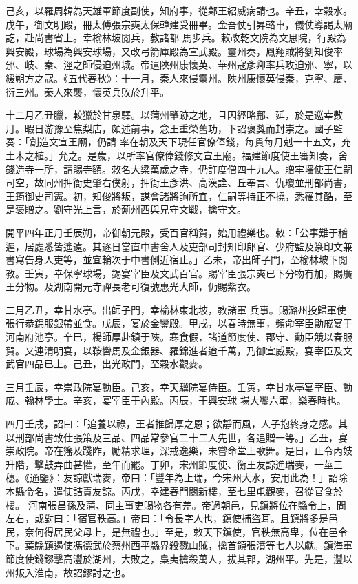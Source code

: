 \begin{pinyinscope}
 己亥，以羅周韓為天雄軍節度副使，知府事，從鄴王紹威病請也。辛丑，幸穀水。戊午，御文明殿，冊太傅張宗奭太保韓建受冊畢。金吾仗引昇輅車，儀仗導謁太廟訖，赴尚書省上。幸榆林坡閱兵，教諸都
 馬步兵。敕改乾文院為文思院，行殿為興安殿，球場為興安球場，又改弓箭庫殿為宣武殿。靈州奏，鳳翔賊將劉知俊率邠、岐、秦、涇之師侵迫州城。帝遣陜州康懷英、華州寇彥卿率兵攻迫邠、寧，以緩朔方之寇。《五代春秋》：十一月，秦人來侵靈州。陜州康懷英侵秦，克寧、慶、衍三州。秦人來襲，懷英兵敗於升平。



 十二月乙丑臘，較獵於甘泉驛。以蒲州肇跡之地，且因經略鄜、延，於是巡幸數月。暇日游豫至焦梨店，頗述前事，念王重榮舊功，下詔褒獎而封崇之。國子監奏：「創造文宣王廟，仍請
 率在朝及天下現任官僚俸錢，每貫每月剋一十五文，充土木之植。」允之。是歲，以所率官僚俸錢修文宣王廟。福建節度使王審知奏，舍錢造寺一所，請賜寺額。敕名大梁萬歲之寺，仍許度僧四十九人。贈牢墻使王仁嗣司空，故同州押衙史肇右僕射，押衙王彥洪、高漢詮、丘奉言、仇瓊並刑部尚書，王筠御史司憲。初，知俊將叛，謀會諸將詢所宜，仁嗣等持正不撓，悉罹其酷，至是褒贈之。劉守光上言，於薊州西與兄守文戰，擒守文。



 開平四年正月壬辰朔，帝御朝元殿，受百官稱賀，始用禮樂也。敕：「公事難于稽遲，居處悉皆遙遠。其逐日當直中書舍人及吏部司封知印郎官、少府監及篆印文兼書寫告身人吏等，並宜輪次于中書側近宿止。」乙未，帝出師子門，至榆林坡下閱教。壬寅，幸保寧球場，錫宴宰臣及文武百官。賜宰臣張宗奭已下分物有加，賜廣王分物。及湖南開元寺禪長老可復號惠光大師，仍賜紫衣。



 二月乙丑，幸甘水亭。出師子門，幸榆林東北坡，教諸軍
 兵事。賜潞州投歸軍使張行恭錦服銀帶並食。戊辰，宴於金鑾殿。甲戌，以春時無事，頻命宰臣勛戚宴于河南府池亭。辛巳，楊師厚赴鎮于陜。寒食假，諸道節度使、郡守、勳臣競以春服賀。又連清明宴，以鞍轡馬及金銀器、羅錦進者迨千萬，乃御宣威殿，宴宰臣及文武官四品已上。己丑，出光政門，至穀水觀麥。



 三月壬辰，幸崇政院宴勳臣。己亥，幸天驥院宴侍臣。壬寅，幸甘水亭宴宰臣、勳戚、翰林學士。辛亥，宴宰臣于內殿。丙辰，于興安球
 場大饗六軍，樂春時也。



 四月壬戌，詔曰：「追養以祿，王者推歸厚之恩；欲靜而風，人子抱終身之感。其以刑部尚書致仕張策及三品、四品常參官二十二人先世，各追贈一等。」乙丑，宴崇政院。帝在籓及踐阼，勵精求理，深戒逸樂，未嘗命堂上歌舞。是日，止令內妓升階，擊鼓弄曲甚懽，至午而罷。丁卯，宋州節度使、衡王友諒進瑞麥，一莖三穗。《通鑒》：友諒獻瑞麥，帝曰：「豐年為上瑞，今宋州大水，安用此為！」詔除本縣令名，遣使詰責友諒。丙戌，幸建春門閱新樓，至七里屯觀麥，召從官食於樓。
 河南張昌孫及蒲、同主事吏賜物各有差。帝過朝邑，見鎮將位在縣令上，問左右，或對曰：「宿官秩高。」帝曰：「令長字人也，鎮使捕盜耳。且鎮將多是邑民，奈何得居民父母上，是無禮也。」至是，敕天下鎮使，官秩無高卑，位在邑令下。葉縣鎮遏使馮德武於蔡州西平縣界殺戮山賊，擒首領張濆等七人以獻。鎮海軍節度使錢鏐擊高灃於湖州，大敗之，梟夷擒殺萬人，拔其郡，湖州平。先是，灃以州叛入淮南，故詔鏐討之也。




\end{pinyinscope}

